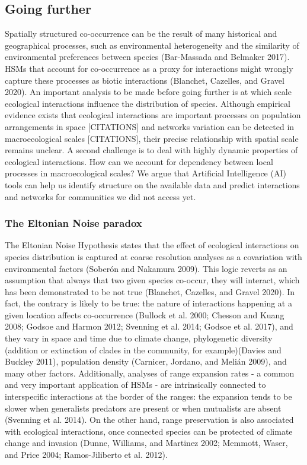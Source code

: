\documentclass[11pt]{article}
\begin{document}
\hypertarget{going-further}{%
\subsection{Going further}\label{going-further}}

Spatially structured co-occurrence can be the result of many historical
and geographical processes, such as environmental heterogeneity and the
similarity of environmental preferences between species (Bar-Massada and
Belmaker 2017). HSMs that account for co-occurrence as a proxy for
interactions might wrongly capture these processes as biotic
interactions (Blanchet, Cazelles, and Gravel 2020). An important
analysis to be made before going further is at which scale ecological
interactions influence the distribution of species. Although empirical
evidence exists that ecological interactions are important processes on
population arrangements in space {[}CITATIONS{]} and networks variation
can be detected in macroecological scales {[}CITATIONS{]}, their precise
relationship with spatial scale remains unclear. A second challenge is
to deal with highly dynamic properties of ecological interactions. How
can we account for dependency between local processes in macroecological
scales? We argue that Artificial Intelligence (AI) tools can help us
identify structure on the available data and predict interactions and
networks for communities we did not access yet.

\hypertarget{the-eltonian-noise-paradox}{%
\subsubsection{The Eltonian Noise
paradox}\label{the-eltonian-noise-paradox}}

The Eltonian Noise Hypothesis states that the effect of ecological
interactions on species distribution is captured at coarse resolution
analyses as a covariation with environmental factors (Soberón and
Nakamura 2009). This logic reverts as an assumption that always that two
given species co-occur, they will interact, which has been demonstrated
to be not true (Blanchet, Cazelles, and Gravel 2020). In fact, the
contrary is likely to be true: the nature of interactions happening at a
given location affects co-occurrence (Bullock et al. 2000; Chesson and
Kuang 2008; Godsoe and Harmon 2012; Svenning et al. 2014; Godsoe et al.
2017), and they vary in space and time due to climate change,
phylogenetic diversity (addition or extinction of clades in the
community, for example)(Davies and Buckley 2011), population density
(Carnicer, Jordano, and Melián 2009), and many other factors.
Additionally, analyses of range expansion rates - a common and very
important application of HSMs - are intrinsically connected to
interspecific interactions at the border of the ranges: the expansion
tends to be slower when generalists predators are present or when
mutualists are absent (Svenning et al. 2014). On the other hand, range
preservation is also associated with ecological interactions, once
connected species can be protected of climate change and invasion
(Dunne, Williams, and Martinez 2002; Memmott, Waser, and Price 2004;
Ramos-Jiliberto et al. 2012).
\end{document}
